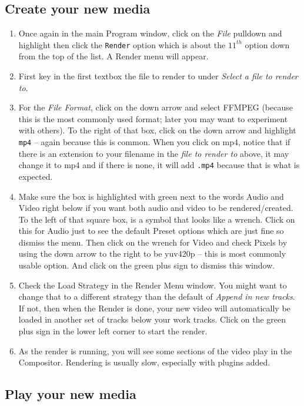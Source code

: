 \subsection{Create your new media}%
\label{sub:create_new_media}

\begin{enumerate}
	\item Once again in the main Program window, click on the \textit{File} pulldown and highlight then click the \texttt{Render}
	option which is about the $11^{th}$ option down from the top of the list.  A \CGG{} Render menu will
	appear.
	\item First key in the first textbox the file to render to under \textit{Select a file to render to}.
	\item For the \textit{File Format}, click on the down arrow and select FFMPEG (because this is the most
	commonly used format; later you may want to experiment with others).  To the right of that box,
	click on the down arrow and highlight \texttt{mp4} -- again because this is common.  When you click on 
	mp4, notice that if there is an extension to your filename in the \textit{file to render to} above, it may
	change it to mp4 and if there is none, it will add \texttt{.mp4} because that is what is expected.
	\item Make sure the box is highlighted with green next to the words Audio and Video right below if you
	want both audio and video to be rendered/created.  To the left of that square box, is a symbol that looks like a
	wrench.  Click on this for Audio just to see the default Preset options which are just fine so dismiss
	the menu.  Then click on the wrench for Video and check Pixels by using the down arrow to the
	right to be yuv420p -- this is most commonly usable option.  And click on the green plus sign to dismiss this window.
	\item Check the Load Strategy in the Render Menu window.  You might want to change that to
	a different strategy than the default of \textit{Append in new tracks}.  If not, then when the Render is done,
	your new video will automatically be loaded in another set of tracks below your work tracks.  Click
	on the green plus sign in the lower left corner to start the render.
	\item As the render is running, you will see some sections of the video play in the Compositor.  Rendering is usually
	slow, especially with plugins added.
\end{enumerate}

\subsection{Play your new media}%
\label{sub:play_your_new_media}

